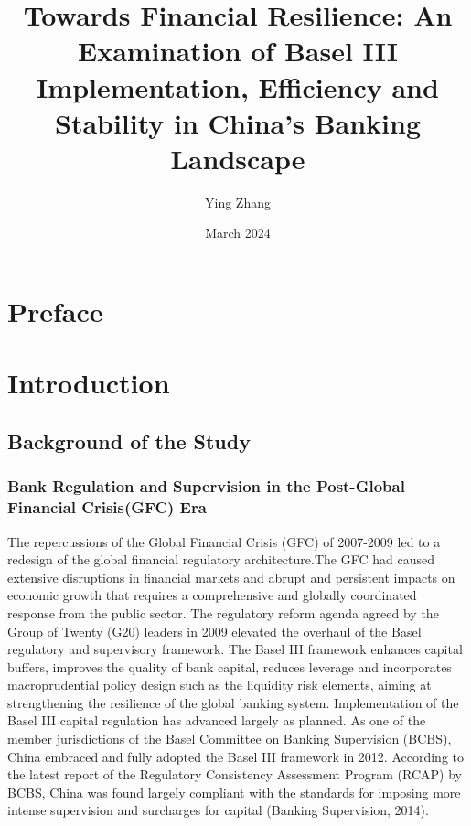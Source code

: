 \documentclass[
  12pt,
  a4paper,
  DIV=11,
  numbers=noendperiod]{scrreprt}
\title{Towards Financial Resilience: An Examination of Basel III
Implementation, Efficiency and Stability in China's Banking Landscape}
\author{Ying Zhang}
\date{March 2024}
\renewcommand*\contentsname{Table of contents}
\newcommand\contentsname{Table of contents}
\begin{document}
\maketitle

\renewcommand*\contentsname{Table of contents}
{
\hypersetup{linkcolor=}
\setcounter{tocdepth}{2}
\tableofcontents
}

\chapter*{Preface}\label{preface}



\chapter{Introduction}\label{introduction}

\section{Background of the Study}\label{background-of-the-study}

\subsection{Bank Regulation and Supervision in the Post-Global Financial
Crisis(GFC)
Era}\label{bank-regulation-and-supervision-in-the-post-global-financial-crisisgfc-era}

The repercussions of the Global Financial Crisis (GFC) of 2007-2009 led
to a redesign of the global financial regulatory architecture.The GFC
had caused extensive disruptions in financial markets and abrupt and
persistent impacts on economic growth that requires a comprehensive and
globally coordinated response from the public sector. The regulatory
reform agenda agreed by the Group of Twenty (G20) leaders in 2009
elevated the overhaul of the Basel regulatory and supervisory framework.
The Basel III framework enhances capital buffers, improves the quality
of bank capital, reduces leverage and incorporates macroprudential
policy design such as the liquidity risk elements, aiming at
strengthening the resilience of the global banking system.
Implementation of the Basel III capital regulation has advanced largely
as planned. As one of the member jurisdictions of the Basel Committee on
Banking Supervision (BCBS), China embraced and fully adopted the Basel
III framework in 2012. According to the latest report of the Regulatory
Consistency Assessment Program (RCAP) by BCBS, China was found largely
compliant with the standards for imposing more intense supervision and
surcharges for capital (Banking Supervision, 2014).
\end{document}
